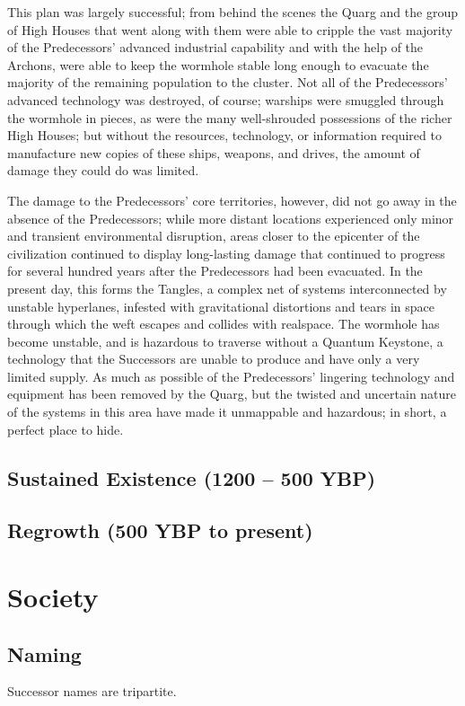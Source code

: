 \documentclass[11pt]{report}
\begin{document}
    This plan was largely successful; from behind the scenes the Quarg and the group of High Houses that went along with them were able to cripple the vast majority of the Predecessors' advanced industrial capability and with the help of the Archons, were able to keep the wormhole stable long enough to evacuate the majority of the remaining population to the cluster. Not all of the Predecessors' advanced technology was destroyed, of course; warships were smuggled through the wormhole in pieces, as were the many well-shrouded possessions of the richer High Houses; but without the resources, technology, or information required to manufacture new copies of these ships, weapons, and drives, the amount of damage they could do was limited.

    The damage to the Predecessors' core territories, however, did not go away in the absence of the Predecessors; while more distant locations experienced only minor and transient environmental disruption, areas closer to the epicenter of the civilization continued to display long-lasting damage that continued to progress for several hundred years after the Predecessors had been evacuated. In the present day, this forms the Tangles, a complex net of systems interconnected by unstable hyperlanes, infested with gravitational distortions and tears in space through which the weft escapes and collides with realspace. The wormhole has become unstable, and is hazardous to traverse without a Quantum Keystone, a technology that the Successors are unable to produce and have only a very limited supply. As much as possible of the Predecessors' lingering technology and equipment has been removed by the Quarg, but the twisted and uncertain nature of the systems in this area have made it unmappable and hazardous; in short, a perfect place to hide.

    \subsection{Sustained Existence (1200 -- 500 YBP)}
    \subsection{Regrowth (500 YBP to present)}
    \section{Society}
    \subsection{Naming}
    Successor names are tripartite.
    
\end{document}
